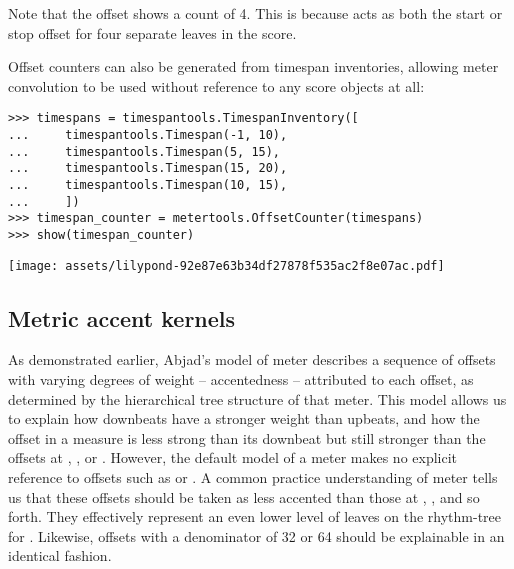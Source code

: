 \noindent Note that the offset  shows a count of 4. This is because
 acts as both the start or stop offset for four separate leaves in
the score.

Offset counters can also be generated from timespan inventories, allowing meter
convolution to be used without reference to any score objects at all:

\begin{comment}
<abjad>
timespans = timespantools.TimespanInventory([
    timespantools.Timespan(-1, 10),
    timespantools.Timespan(5, 15),
    timespantools.Timespan(15, 20),
    timespantools.Timespan(10, 15),
    ])
timespan_counter = metertools.OffsetCounter(timespans)
show(timespan_counter)
</abjad>
\end{comment}

\begin{abjadbookoutput}
\begin{singlespacing}
\vspace{-0.5\baselineskip}
\begin{verbatim}
>>> timespans = timespantools.TimespanInventory([
...     timespantools.Timespan(-1, 10),
...     timespantools.Timespan(5, 15),
...     timespantools.Timespan(15, 20),
...     timespantools.Timespan(10, 15),
...     ])
>>> timespan_counter = metertools.OffsetCounter(timespans)
>>> show(timespan_counter)
\end{verbatim}
\noindent\texttt{[image: assets/lilypond-92e87e63b34df27878f535ac2f8e07ac.pdf]}
\end{singlespacing}
\end{abjadbookoutput}

\subsection{Metric accent kernels} %
\label{ssec:metric-accent-kernels}

As demonstrated earlier, Abjad's model of meter describes a sequence of offsets
with varying degrees of weight -- accentedness -- attributed to each offset, as
determined by the hierarchical tree structure of that meter. This model allows
us to explain how downbeats have a stronger weight than upbeats, and how the
 offset in a  measure is less strong than its downbeat
but still stronger than the offsets at , , 
or . However, the default model of a  meter makes no
explicit reference to offsets such as  or . A common
practice understanding of meter tells us that these offsets should be taken as
less accented than those at , ,  and so
forth. They effectively represent an even lower level of leaves on the
rhythm-tree for . Likewise, offsets with a denominator of 32 or 64
should be explainable in an identical fashion.

